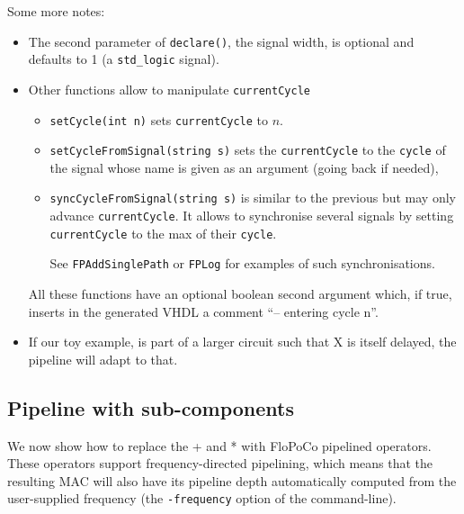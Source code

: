 \documentclass{article}
\begin{document}
Some more notes:
\begin{itemize}
\item The second parameter of \verb!declare()!, the signal width, is
  optional and defaults to 1 (a \verb!std_logic! signal).

\item Other functions allow to manipulate \verb!currentCycle!
  \begin{itemize}
  \item 
    \verb!setCycle(int n)! sets \verb!currentCycle! to  $n$.  
  \item \verb!setCycleFromSignal(string s)!  
    sets the \verb!currentCycle! to the \verb!cycle! of the signal
    whose name is given as an argument (going back if needed),
  \item 
    \verb!syncCycleFromSignal(string s)! is similar to the previous but may only advance
    \verb!currentCycle!. It allows to synchronise several
    signals by setting \verb!currentCycle! to the max of their
    \verb!cycle!.

See \verb!FPAddSinglePath! or \verb!FPLog! for examples of
  such synchronisations. 
  \end{itemize}

All these functions have an optional boolean
  second argument which, if true, inserts in the generated VHDL a
  comment ``-- entering cycle n''.


\item If our toy example, is part of a larger circuit such that X is
  itself delayed, the pipeline will adapt to that.

\end{itemize}


\subsection{Pipeline with sub-components}

We now show how to replace the + and * with FloPoCo pipelined
operators. These operators support frequency-directed pipelining,
which means that the resulting MAC will also have its pipeline depth
automatically computed from the user-supplied frequency (the
\texttt{-frequency} option of the command-line).
\end{document}
